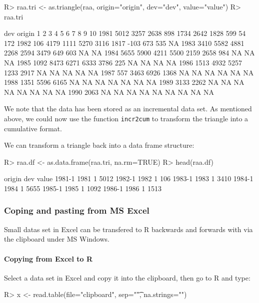 \documentclass{article}
\begin{document}
\begin{Schunk}
\begin{Sinput}
R> raa.tri <- as.triangle(raa, origin="origin", dev="dev", value="value")
R> raa.tri
\end{Sinput}
\begin{Soutput}
      dev
origin    1    2    3    4    5    6    7   8   9  10
  1981 5012 3257 2638  898 1734 2642 1828 599  54 172
  1982  106 4179 1111 5270 3116 1817 -103 673 535  NA
  1983 3410 5582 4881 2268 2594 3479  649 603  NA  NA
  1984 5655 5900 4211 5500 2159 2658  984  NA  NA  NA
  1985 1092 8473 6271 6333 3786  225   NA  NA  NA  NA
  1986 1513 4932 5257 1233 2917   NA   NA  NA  NA  NA
  1987  557 3463 6926 1368   NA   NA   NA  NA  NA  NA
  1988 1351 5596 6165   NA   NA   NA   NA  NA  NA  NA
  1989 3133 2262   NA   NA   NA   NA   NA  NA  NA  NA
  1990 2063   NA   NA   NA   NA   NA   NA  NA  NA  NA
\end{Soutput}
\end{Schunk}
We note that the data has been stored as an incremental data set. As
mentioned above, we could now use the function \texttt{incr2cum} to
transform the triangle into a cumulative format.

We can transform a triangle back into a data frame structure:
\begin{Schunk}
\begin{Sinput}
R> raa.df <- as.data.frame(raa.tri, na.rm=TRUE)
R> head(raa.df)
\end{Sinput}
\begin{Soutput}
       origin dev value
1981-1   1981   1  5012
1982-1   1982   1   106
1983-1   1983   1  3410
1984-1   1984   1  5655
1985-1   1985   1  1092
1986-1   1986   1  1513
\end{Soutput}
\end{Schunk}

\subsubsection{Coping and pasting from MS Excel}
Small datas set in Excel can be transfered to R backwards and forwards
with via the clipboard under MS Windows.
\paragraph{Copying from Excel to R}
Select a data set in Excel and copy it into the clipboard, then go to
R and type:
\begin{Schunk}
\begin{Sinput}
R> x <- read.table(file="clipboard", sep="\t", na.strings="")
\end{Sinput}
\end{Schunk}
\end{document}
